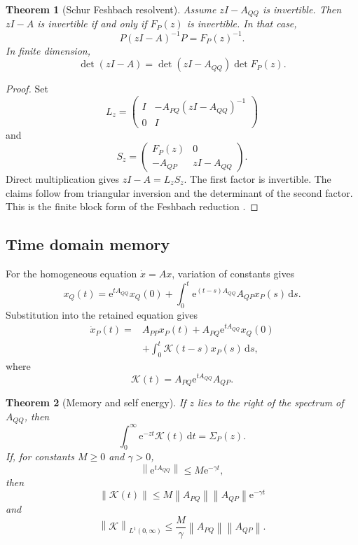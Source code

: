 \documentclass[11pt,letterpaper]{article}
\newtheorem{theorem}{Theorem}[section]
\theoremstyle{plain}
\theoremstyle{plain}
\theoremstyle{plain}
\theoremstyle{definition}
\theoremstyle{definition}
\theoremstyle{definition}
\theoremstyle{definition}
\theoremstyle{definition}
\theoremstyle{remark}
\theoremstyle{remark}
\theoremstyle{remark}
\theoremstyle{remark}
\theoremstyle{remark}
\newcommand{\norm}[1]{\left\lVert#1\right\rVert}
\theoremstyle{remark}
\newcommand{\Kcal}{\mathcal K}
\newcommand{\e}{\mathrm e}
\newcommand{\dd}{\,\mathrm d}
\let\KomorebiPrimitiveMathcal\mathcal
\renewcommand{\mathcal}[1]{{\KomorebiPrimitiveMathcal{#1}}}
\let\KomorebiPrimitivemathrm\mathrm
\renewcommand{\mathrm}[1]{{\KomorebiPrimitivemathrm{#1}}}
\begin{document}
\begin{theorem}[Schur Feshbach resolvent]\label{extended:record:085}\label{extended:thm:feshbach_resolvent}
Assume \(zI-A_{QQ}\) is invertible. Then \(zI-A\) is invertible if and only if \(F_P(z)\) is invertible. In that case,
\[
P(zI-A)^{-1}P
=
F_P(z)^{-1}.
\]
In finite dimension,
\[
\det(zI-A)
=
\det(zI-A_{QQ})\det F_P(z).
\]
\end{theorem}

\begin{proof}
Set
\[
L_z=
\begin{pmatrix}
I&-A_{PQ}(zI-A_{QQ})^{-1}\\
0&I
\end{pmatrix}
\]
and
\[
S_z=
\begin{pmatrix}
F_P(z)&0\\
-A_{QP}&zI-A_{QQ}
\end{pmatrix}.
\]
Direct multiplication gives \(zI-A=L_zS_z\). The first factor is invertible. The claims follow from triangular inversion and the determinant of the second factor. This is the finite block form of the Feshbach reduction \cite{Feshbach1958}.
\end{proof}

\subsection{Time domain memory}

For the homogeneous equation \(\dot x=Ax\), variation of constants gives
\[
x_Q(t)
=
\e^{tA_{QQ}}x_Q(0)
+
\int_0^t
\e^{(t-s)A_{QQ}}A_{QP}x_P(s)
\dd s.
\]
Substitution into the retained equation gives
\[
\begin{aligned}
\dot x_P(t)
={}&
A_{PP}x_P(t)
+
A_{PQ}\e^{tA_{QQ}}x_Q(0)\\
&+
\int_0^t
\Kcal(t-s)x_P(s)
\dd s,
\end{aligned}
\]
where
\[
\Kcal(t)
=
A_{PQ}\e^{tA_{QQ}}A_{QP}.
\]

\begin{theorem}[Memory and self energy]\label{extended:record:086}\label{extended:thm:memory_self_energy}
If \(z\) lies to the right of the spectrum of \(A_{QQ}\), then
\[
\int_0^\infty
\e^{-zt}\Kcal(t)\dd t
=
\Sigma_P(z).
\]
If, for constants \(M\geq0\) and \(\gamma>0\),
\[
\norm{\e^{tA_{QQ}}}
\leq
M\e^{-\gamma t},
\]
then
\[
\norm{\Kcal(t)}
\leq
M\norm{A_{PQ}}\norm{A_{QP}}\e^{-\gamma t}
\]
and
\[
\norm{\Kcal}_{L^1(0,\infty)}
\leq
\frac{M}{\gamma}
\norm{A_{PQ}}\norm{A_{QP}}.
\]
\end{theorem}
\end{document}
